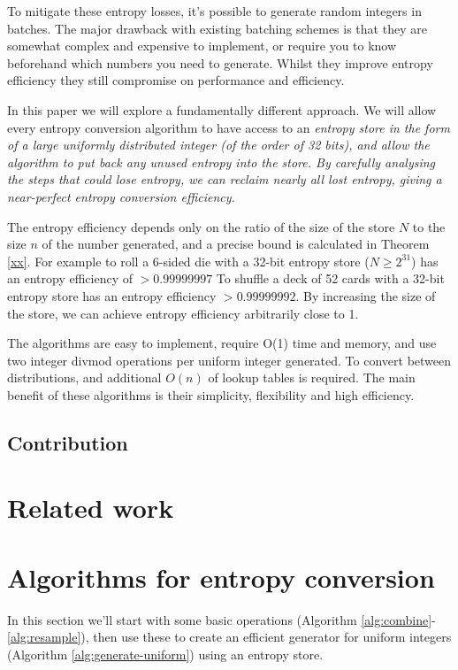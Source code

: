 \documentclass[12pt]{article}
\begin{document}
To mitigate these entropy losses, it's possible to generate random integers in batches. The major drawback with existing batching schemes is that they are somewhat complex and expensive to implement, or require you to know beforehand which numbers you need to generate. Whilst they improve entropy efficiency they still compromise on performance and efficiency.

In this paper we will explore a fundamentally different approach. We will allow every entropy conversion algorithm to have access to an \em entropy store \em in the form of a large uniformly distributed integer (of the order of 32 bits), and allow the algorithm to put back any unused entropy into the store. By carefully analysing the steps that could lose entropy, we can reclaim nearly all lost entropy, giving a near-perfect entropy conversion efficiency. 

The entropy efficiency depends only on the ratio of the size of the store $N$ to the size $n$ of the number generated, and a precise bound is calculated in Theorem \ref{xx}. For example to roll a 6-sided die with a 32-bit entropy store ($N\ge2^{31}$) has an entropy efficiency of $>0.99999997$ To shuffle a deck of 52 cards with a 32-bit entropy store has an entropy efficiency $>0.99999992$. By increasing the size of the store, we can achieve entropy efficiency arbitrarily close to 1.

The algorithms are easy to implement, require O(1) time and memory, and use two integer divmod operations per uniform integer generated. To convert between distributions, and additional $O(n)$ of lookup tables is required. The main benefit of these algorithms is their simplicity, flexibility and high efficiency.

\subsection {Contribution}

\section{Related work}


\section{Algorithms for entropy conversion}

In this section we'll start with some basic operations (Algorithm \ref{alg:combine}-\ref{alg:resample}), then use these to create an efficient generator for uniform integers (Algorithm \ref{alg:generate-uniform}) using an entropy store.
\end{document}
